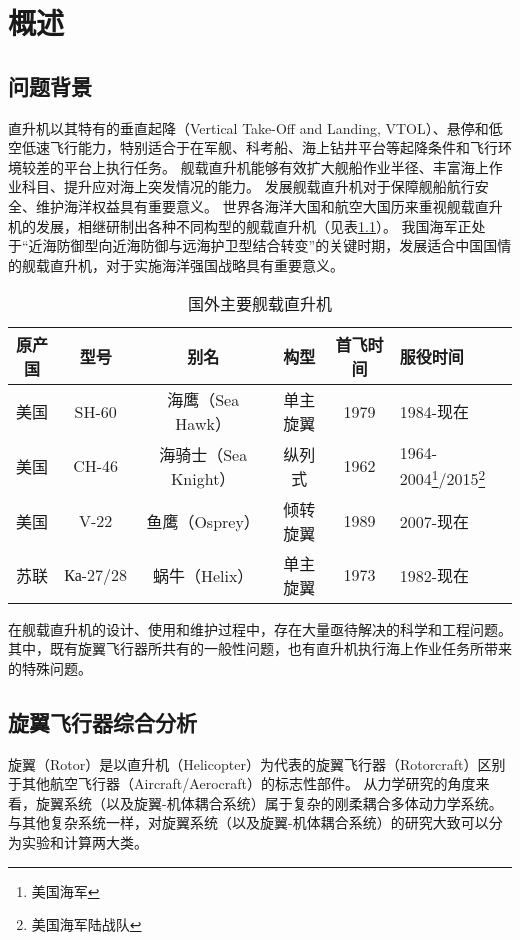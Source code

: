 \chapter{概述}

\section{问题背景}
直升机以其特有的垂直起降（Vertical Take-Off and Landing, VTOL）、悬停和低空低速飞行能力，特别适合于在军舰、科考船、海上钻井平台等起降条件和飞行环境较差的平台上执行任务。
舰载直升机能够有效扩大舰船作业半径、丰富海上作业科目、提升应对海上突发情况的能力。
发展舰载直升机对于保障舰船航行安全、维护海洋权益具有重要意义。
世界各海洋大国和航空大国历来重视舰载直升机的发展，相继研制出各种不同构型的舰载直升机（见表\ref{Marine-Helicopter}）。
我国海军正处于“近海防御型向近海防御与远海护卫型结合转变”的关键时期，发展适合中国国情的舰载直升机，对于实施海洋强国战略具有重要意义。
\begin{longtable}[c]{cccccl}
\caption{国外主要舰载直升机}
\label{Marine-Helicopter}\\\toprule[1pt]
原产国 & 型号 & 别名 & 构型 & 首飞时间 & 服役时间
\\\midrule
美国 & SH-60 & 海鹰（Sea Hawk） & 单主旋翼 & 1979 & 1984-现在  \\
美国 & CH-46 & 海骑士（Sea Knight） & 纵列式 & 1962 & 1964-2004\footnote{美国海军}/2015\footnote{美国海军陆战队}  \\
美国 & V-22 & 鱼鹰（Osprey） & 倾转旋翼 & 1989 & 2007-现在  \\
苏联 & Ка-27/28 & 蜗牛（Helix） & 单主旋翼 & 1973 & 1982-现在  \\
\bottomrule[1pt]
\end{longtable}

在舰载直升机的设计、使用和维护过程中，存在大量亟待解决的科学和工程问题。
其中，既有旋翼飞行器所共有的一般性问题，也有直升机执行海上作业任务所带来的特殊问题。

\section{旋翼飞行器综合分析}
旋翼（Rotor）是以直升机（Helicopter）为代表的旋翼飞行器（Rotorcraft）区别于其他航空飞行器（Aircraft/Aerocraft）的标志性部件。
从力学研究的角度来看，旋翼系统（以及旋翼-机体耦合系统）属于复杂的刚柔耦合多体动力学系统。
与其他复杂系统一样，对旋翼系统（以及旋翼-机体耦合系统）的研究大致可以分为实验和计算两大类。

